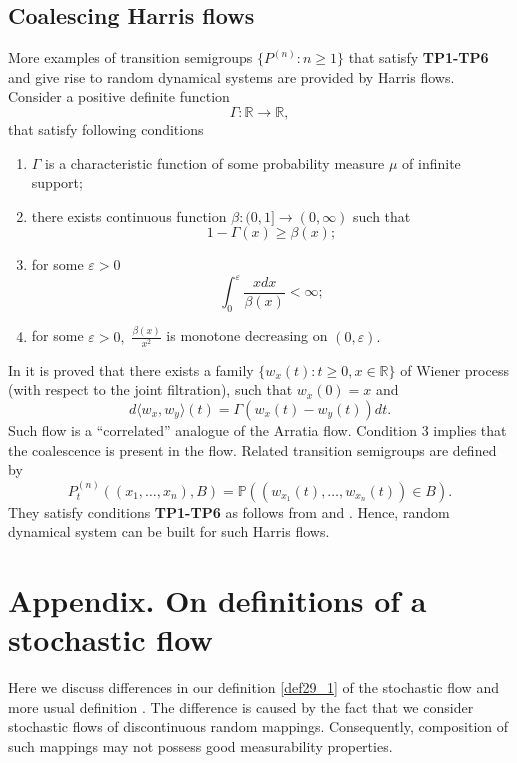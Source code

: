\documentclass[a4paper,12pt]{article}
\newcommand{\1}{1\!\!\,{\rm I}}
\theoremstyle{plain}
\begin{document}
\subsection{Coalescing Harris flows}

More examples of transition semigroups $\{P^{(n)}:n\geq 1\}$ that satisfy {\bf TP1-TP6} and give rise to random dynamical systems are provided by Harris flows.  Consider a positive definite function 
$$
\Gamma:\mathbb{R}\to\mathbb{R},
$$
that satisfy following conditions

\begin{enumerate}
	\item $\Gamma$ is a characteristic function of some probability measure $\mu$ of infinite support;
	
	
	\item there exists continuous function $\beta:(0,1]\to (0,\infty)$ such that 
	$$
	1-\Gamma(x)\geq \beta(x);
	$$
	
	\item for some $\varepsilon>0$
	$$
	\int^\varepsilon_0 \frac{xdx}{\beta(x)}<\infty;
	$$
	
	\item for some $\varepsilon>0,$ $\frac{\beta(x)}{x^2}$ is monotone decreasing on $(0,\varepsilon).$
	
\end{enumerate}

In \cite{Harris} it is proved that there exists a family $\{w_{x}(t):t\geq 0, x\in\mathbb{R}\}$ of Wiener process (with respect to the joint filtration), such that $w_x(0)=x$ and 
$$
d\langle w_x,w_y\rangle(t)=\Gamma(w_x(t)-w_y(t))dt.
$$
Such flow is a ``correlated'' analogue of the Arratia flow. Condition 3 implies that the coalescence is present in the flow. Related transition semigroups are defined by 
$$
P^{(n)}_t((x_1,\ldots,x_n),B)=\mathbb{P}((w_{x_1}(t),\ldots,w_{x_n}(t))\in B).
$$ 
They satisfy conditions {\bf TP1-TP6} as follows from \cite{Harris} and \cite[Th. 3.2]{Matsumoto}. Hence, random dynamical system can be built for such Harris flows.



\section{Appendix. On definitions of a stochastic flow}

Here we discuss differences in our definition \ref{def29_1} of the stochastic flow and more usual definition \cite[Def. 1.6]{LJR}. The difference is caused by the fact that we consider stochastic flows of discontinuous random mappings. Consequently, composition of such mappings may not possess good measurability properties. 
\end{document}
